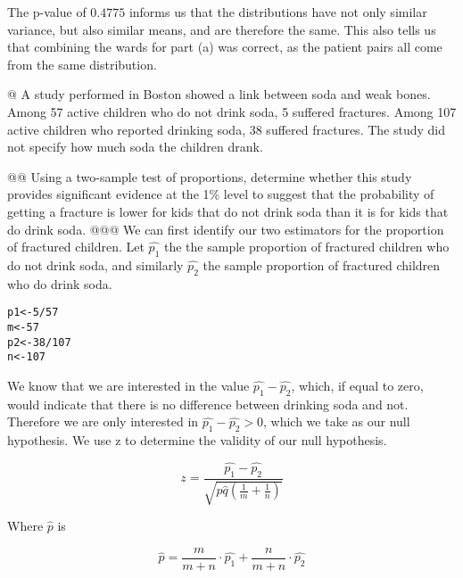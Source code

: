 \documentclass[10pt]{article}\usepackage[]{graphicx}\usepackage[]{xcolor}
\makeatletter
\newcommand{\hlnum}[1]{\textcolor[rgb]{0.686,0.059,0.569}{#1}}%
\newcommand{\hlopt}[1]{\textcolor[rgb]{0,0,0}{#1}}%
\newcommand{\hlstd}[1]{\textcolor[rgb]{0.345,0.345,0.345}{#1}}%
\newcommand{\hlkwb}[1]{\textcolor[rgb]{0.69,0.353,0.396}{#1}}%
\newenvironment{kframe}{%
 \def\at@end@of@kframe{}%
 \ifinner\ifhmode%
  \def\at@end@of@kframe{\end{minipage}}%
  \begin{minipage}{\columnwidth}%
 \fi\fi%
 \def\FrameCommand##1{\hskip\@totalleftmargin \hskip-\fboxsep
 \colorbox{shadecolor}{##1}\hskip-\fboxsep
     \hskip-\linewidth \hskip-\@totalleftmargin \hskip\columnwidth}%
 \MakeFramed {\advance\hsize-\width
   \@totalleftmargin\z@ \linewidth\hsize
   \@setminipage}}%
 {\par\unskip\endMakeFramed%
 \at@end@of@kframe}
\newenvironment{knitrout}{}{} %
\makeatother
\begin{document}
\begin{easylist}[enumerate]
    The p-value of $0.4775$ informs us that the distributions have not only similar variance, but also similar means,
    and are therefore the same. This also tells us that combining the wards for part (a) was correct, as the patient
    pairs all come from the same distribution.

    @ A study performed in Boston showed a link between soda and weak bones. Among 57 active children who do not drink
    soda, 5 suffered fractures. Among 107 active children who reported drinking soda, 38 suffered fractures. The study
    did not specify how much soda the children drank.

    @@ Using a two-sample test of proportions, determine whether this study provides significant evidence at the 1\%
    level to suggest that the probability of getting a fracture is lower for kids that do not drink soda than it is for
    kids that do drink soda.
    @@@ We can first identify our two estimators for the proportion of fractured children. Let $\hat{p_1}$ the the
    sample proportion of fractured children who do not drink soda, and similarly $\hat{p_2}$ the sample proportion of
    fractured children who do drink soda.

\begin{knitrout}
\color{fgcolor}\begin{kframe}
\begin{alltt}
             \hlstd{p1} \hlkwb{<-} \hlnum{5} \hlopt{/} \hlnum{57}
             \hlstd{m}  \hlkwb{<-} \hlnum{57}
             \hlstd{p2} \hlkwb{<-} \hlnum{38} \hlopt{/} \hlnum{107}
             \hlstd{n}  \hlkwb{<-} \hlnum{107}
\end{alltt}
\end{kframe}
\end{knitrout}


    We know that we are interested in the value $\hat{p_1} - \hat{p_2}$, which, if equal to zero, would indicate that
    there is no difference between drinking soda and not. Therefore we are only interested in $\hat{p_1} - \hat{p_2} >
    0$, which we take as our null hypothesis. We use z to determine the validity of our null hypothesis.

    \[
        z = \frac{\hat{p_1} - \hat{p_2}}{\sqrt{\hat{p}\hat{q} \left( \frac{1}{m} + \frac{1}{n} \right)}}
    \]

    Where $\hat{p}$ is

    \[
        \hat{p} = \frac{m}{m + n} \cdot \hat{p_1} + \frac{n}{m + n} \cdot \hat{p_2}
    \]


\end{easylist}
\end{document}
